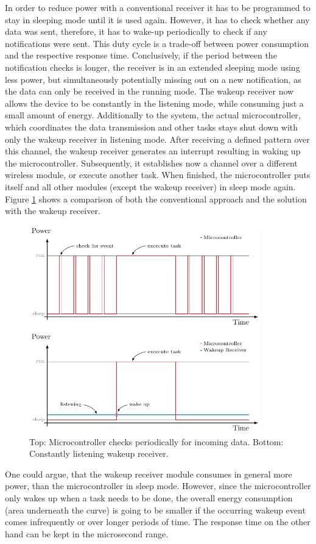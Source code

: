 In order to reduce power with a conventional receiver it has to be programmed to stay in sleeping mode until it is used again. However, it has to check whether any data was sent, therefore, it has to wake-up periodically to check if any notifications were sent. This duty cycle is a trade-off between power consumption and the respective response time. Conclusively, if the period between the notification checks is longer, the receiver is in an extended sleeping mode using less power, but simultaneously potentially missing out on a new notification, as the data can only be received in the running mode. The wakeup receiver now allows the device to be constantly in the listening mode, while consuming just a small amount of energy. Additionally to the system, the actual microcontroller, which coordinates the data transmission and other tasks stays shut down with only the wakeup receiver in listening mode. After receiving a defined pattern over this channel, the wakeup receiver generates an interrupt resulting in waking up the microcontroller. Subsequently, it establishes now a channel over a different wireless module, or execute another task. When finished, the microcontroller puts itself and all other modules (except the wakeup receiver) in sleep mode again. Figure \ref{theory:wake} shows a comparison of both the conventional approach and the solution with the wakeup receiver.
\begin{figure}[ht]
	\centering
	\includegraphics[width=0.9\textwidth]{2-theory/wakeup/graphics/wake_comp.pdf}
	\caption{Top: Microcontroller checks periodically for incoming data. Bottom: Constantly listening  wakeup receiver.\label{theory:wake}}
\end{figure}

One could argue, that the wakeup receiver module consumes in general more power, than the
microcontroller in sleep mode. However, since the microcontroller only wakes up when a task needs to be done, the overall energy consumption (area underneath the curve) is going to be smaller if the occurring wakeup event comes infrequently or over longer periods of time. The response time on the other hand can be kept in the microsecond range.
